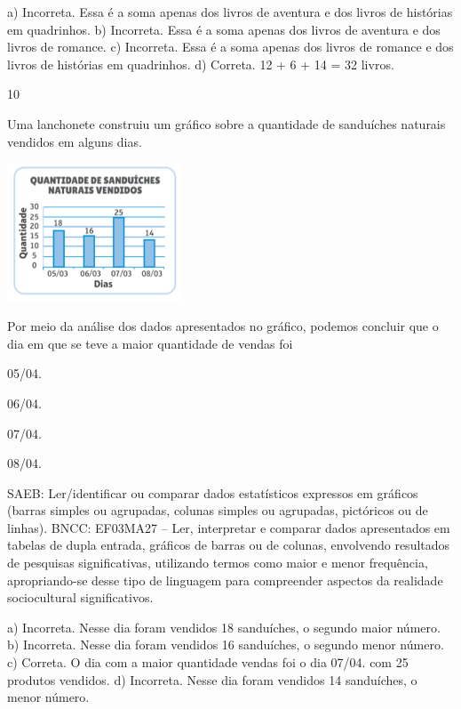 \begin{multicols}{2}
\begin{enumerate}
{a) Incorreta. Essa é a soma apenas dos livros de aventura e dos livros de histórias em quadrinhos.
b) Incorreta. Essa é a soma apenas dos livros de aventura e dos livros de romance.
c) Incorreta. Essa é a soma apenas dos livros de romance e dos livros de histórias em quadrinhos.
d) Correta. 12 + 6 + 14 = 32 livros.

\num{10}

Uma lanchonete construiu um gráfico sobre a quantidade de sanduíches
naturais vendidos em alguns dias.

\includegraphics[width=2.05128in,height=1.61850in]{media/image124.png}


Por meio da análise dos dados apresentados no gráfico, podemos concluir que o dia em que se teve a maior quantidade de vendas foi

\begin{escolha}

\item
  05/04.
\item
  06/04.
\item
  07/04.
\item
  08/04.
\end{escolha}

SAEB: Ler/identificar ou comparar dados estatísticos
expressos em gráficos (barras simples ou agrupadas, colunas simples ou
agrupadas, pictóricos ou de linhas).
BNCC: EF03MA27 -- Ler, interpretar e comparar dados apresentados em tabelas de dupla entrada,
gráficos de barras ou de colunas, envolvendo resultados de pesquisas significativas, utilizando
termos como maior e menor frequência, apropriando-se desse tipo de linguagem para
compreender aspectos da realidade sociocultural significativos.

a) Incorreta. Nesse dia foram vendidos 18 sanduíches, o segundo maior número.
b) Incorreta. Nesse dia foram vendidos 16 sanduíches, o segundo menor número.
c) Correta. O dia com a maior quantidade vendas foi o dia 07/04. com 25 produtos vendidos.
d) Incorreta. Nesse dia foram vendidos 14 sanduíches, o menor número.

}
\end{enumerate}
\end{multicols}
